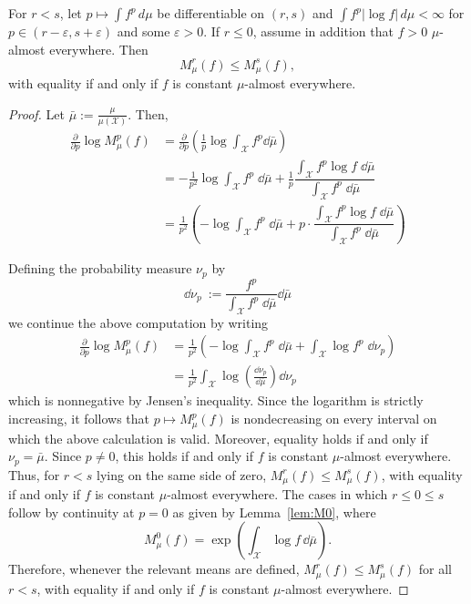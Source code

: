 \documentclass[reqno]{amsart}
\begin{document}
\begin{lem}
\label{lem:M-monotone}
For $r<s$, let $p\mapsto \int f^p\,d\mu$ be differentiable on $(r,s)$ and $\int f^p|\log f|\,d\mu<\infty$ for $p \in (r-\varepsilon,s+\varepsilon)$ and some $\varepsilon>0$. If  $r\leq 0$, assume in addition that $f>0$ $\mu$-almost everywhere. Then
\begin{equation}
\label{eq:ent-r-s-ineq}
M_\mu^r(f)\leq M_\mu^s(f),
\end{equation}
with equality if and only if $f$ is constant
$\mu$-almost everywhere.
\end{lem}
\begin{proof}
Let $\bar\mu:=\frac{\mu}{\mu(\mathcal X)}$.
Then,
$$
\begin{aligned}
\frac{\partial}{\partial p}\log M^p_\mu(f)
&= \frac{\partial}{\partial p} \left(  \frac{1}{p}\log \int_{\mathcal{X}} f^p \dd \bar{\mu}  \right)\\
&=  -\frac{1}{p^2} \log \int_{\mathcal{X}} f^p \;\dd \bar{\mu}  + \frac{1}{p} \dfrac{ \int_{\mathcal{X}} f^p \log f\;\dd \bar{\mu} }{  \int_{\mathcal{X}} f^p \;\dd \bar{\mu}  }  \\
&=\frac{1}{p^2} \left( - \log \int_{\mathcal{X}} f^p \;\dd \bar{\mu}  + p \cdot \dfrac{ \int_{\mathcal{X}} f^p \log f\;\dd \bar{\mu} }{  \int_{\mathcal{X}} f^p \;\dd \bar{\mu}  } \right)
\end{aligned}
$$



Defining the probability measure $\nu_p$ by
$$
\dd\nu_p\
:=
\frac{f^p}{\int_{\mathcal{X}} f^p \;\dd \bar{\mu} } \dd\bar\mu
$$
we continue the above computation by writing
$$
\begin{aligned}
\frac{\partial}{\partial p}\log M^p_\mu(f)
&= \frac{1}{p^2} \left( - \log \int_{\mathcal{X}} f^p \;\dd \bar{\mu}  + \int_{\mathcal{X}}  \log f^p\;\dd\nu_p  \right) \\
&= \frac{1}{p^2}  \int_{\mathcal{X}} \log \left(\frac{\dd\nu_p}{\dd\bar\mu}\right) \dd\nu_p
\end{aligned}
$$
which is nonnegative by Jensen's inequality. 
Since the logarithm is strictly increasing, it follows that $p\mapsto M^p_\mu(f)$ is nondecreasing on every interval on which the above calculation is valid.
Moreover, equality holds if and only if $\nu_p=\bar\mu$.
Since $p\neq0$, this holds if and only if
$f$ is constant $\mu$-almost everywhere.
Thus, for $r<s$ lying on the same side of zero, $M^r_\mu(f)\leq M^s_\mu(f)$, with equality if and only if $f$ is constant $\mu$-almost everywhere.
The cases in which $r\leq0\leq s$ follow by continuity at $p=0$ as given by Lemma~\ref{lem:M0}, where
$$
M^0_\mu(f)
=
\exp\left(
\int_{\mathcal X}\log f\,\dd\bar\mu
\right).
$$
Therefore, whenever the relevant means are defined, $M^r_\mu(f)\leq M^s_\mu(f)$ for all $r<s$,
with equality if and only if $f$ is constant $\mu$-almost everywhere.
\end{proof}
\end{document}
